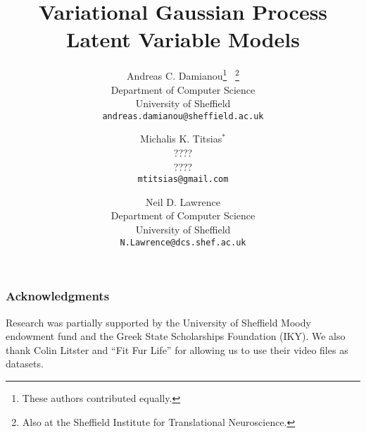 \documentclass [10pt , a4paper]{article}
\title{Variational Gaussian Process Latent Variable Models}
\author{
 Andreas C. Damianou\footnote{These authors contributed equally.} \
 \footnote{Also at the Sheffield Institute for Translational Neuroscience.}\\
 Department of Computer Science\\
 University of Sheffield \\
\texttt{andreas.damianou@sheffield.ac.uk}
            \and
 Michalis K. Titsias$^*$ \\
 ???? \\ %
 ???? \\ %
 \texttt{mtitsias@gmail.com} \\
            \and
 Neil D. Lawrence\footnotemark[\value{footnote}]\\
 Department of Computer Science\\
 University of Sheffield \\
\texttt{N.Lawrence@dcs.shef.ac.uk} 
 }
\begin{document}
\newcommand{\highlight}[1]{\colorbox{yellow}{#1}}

\newcommand{\bff}{\mathbf{f}}
\newcommand{\bfu}{\mathbf{u}}
\newcommand{\bfy}{\mathbf{y}}
\newcommand{\bfx}{\mathbf{x}}
\newcommand{\bft}{\mathbf{t}}
\newcommand{\bfk}{\mathbf{k}}
\newcommand{\bfzi}{\mathbf{z}}
\newcommand{\bfzero}{\mathbf{0}}
\newcommand{\bfmu}{\boldsymbol \mu}
\newcommand{\bfz}{\mathbf{0}}
\newcommand{\bftheta}{\boldsymbol \theta}
\newcommand{\bflambda}{\boldsymbol \lambda}
\newcommand{\bfepsilon}{\boldsymbol \epsilon}
\newcommand{\tr}{\text{tr}}
\newcommand{\tbx}{\tilde{\bfx}}


\newcommand{\ie}{i.e.\ }
\newcommand{\eg}{e.g.\ }

\newcommand{\T}{{\top}}

\newcommand{\bfa}{\mathbf{a}}
\newcommand{\bb}{\beta^{-1}}
\newcommand{\la}{\left\langle}
\newcommand{\ra}{\right\rangle}
\newcommand{\vv}{\vartheta}

\newcommand{\intd}{\text{d}}
\newcommand{\F}{\mathcal{F}}

\newcommand{\KL}[2]{\text{KL} \left[ #1 \parallel #2 \right]}


\date{}
\maketitle

\listoftodos



















\subsubsection*{Acknowledgments}
Research was partially supported by the University of Sheffield Moody endowment fund and the Greek State
 Scholarships Foundation (IKY).
We also thank Colin Litster and ``Fit Fur Life'' for allowing us to use their video files as datasets.

%
%

\renewcommand*{\refname}{\begin{normalsize}References\end{normalsize}}

%






\end{document}
